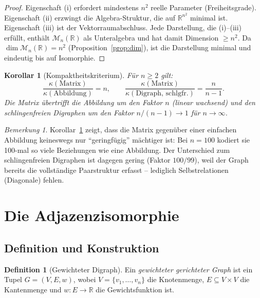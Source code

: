 ﻿\documentclass[12pt, a4paper]{article}
\newtheorem{corollary}[theorem]{Korollar}
\theoremstyle{definition}
\newtheorem{definition}[theorem]{Definition}
\theoremstyle{remark}
\newtheorem{remark}[theorem]{Bemerkung}
\newcommand{\R}{\mathbb{R}}
\begin{document}
\begin{proof}
Eigenschaft (i) erfordert mindestens $n^2$ reelle Parameter (Freiheitsgrade).
Eigenschaft (ii) erzwingt die Algebra-Struktur, die auf $\R^{n^2}$ minimal
ist. Eigenschaft (iii) ist der Vektorraumabschluss. Jede Darstellung, die
(i)--(iii) erfüllt, enthält $\mathcal{M}_n(\R)$ als Unteralgebra und hat
damit Dimension $\geq n^2$. Da $\dim \mathcal{M}_n(\R) = n^2$
(Proposition~\ref{prop:dim}), ist die Darstellung minimal und eindeutig
bis auf Isomorphie.
\end{proof}

\begin{corollary}[Kompaktheitskriterium]
\label{cor:krit}
Für $n \geq 2$ gilt:
\[
  \frac{\kappa(\text{Matrix})}{\kappa(\text{Abbildung})} = n, \qquad
  \frac{\kappa(\text{Matrix})}{\kappa(\text{Digraph, schlgfr.})} = \frac{n}{n-1}.
\]
Die Matrix übertrifft die Abbildung um den Faktor $n$ (linear wachsend)
und den schlingenfreien Digraphen um den Faktor $n/(n-1) \to 1$ für $n \to \infty$.
\end{corollary}

\begin{remark}
Korollar~\ref{cor:krit} zeigt, dass die Matrix gegenüber einer einfachen
Abbildung keineswegs nur ``geringfügig'' mächtiger ist: Bei $n = 100$
kodiert sie 100-mal so viele Beziehungen wie eine Abbildung. Der
Unterschied zum schlingenfreien Digraphen ist dagegen gering (Faktor
$100/99$), weil der Graph bereits die vollständige Paarstruktur
erfasst -- lediglich Selbstrelationen (Diagonale) fehlen.
\end{remark}

\section{Die Adjazenzisomorphie}
\label{sec:adjazenz}

\subsection{Definition und Konstruktion}
\label{subsec:adj_def}

\begin{definition}[Gewichteter Digraph]
Ein \emph{gewichteter gerichteter Graph} ist ein Tupel
$G = (V, E, w)$, wobei $V = \{v_1,\ldots,v_n\}$ die Knotenmenge,
$E \subseteq V \times V$ die Kantenmenge und $w: E \to \R$ die
Gewichtsfunktion ist.
\end{definition}
\end{document}
